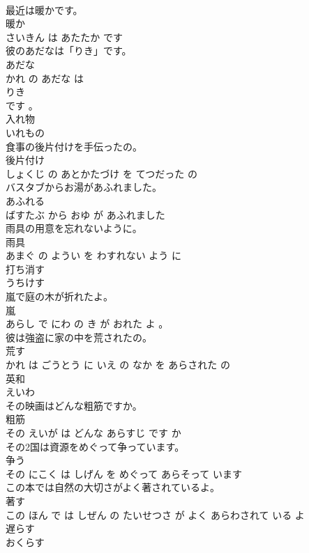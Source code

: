 \documentclass[8pt]{extreport}
\begin{document}
\begin{CJK}{UTF8}{min}
\\	最近は暖かです。	
\\	暖か 
\\	さいきん は あたたか です			
\\	彼のあだなは「りき」です。	
\\	あだな 
\\	かれ の あだな は 
\\	りき 
\\	です 。			
\\	入れ物	
\\	いれもの		
\\	食事の後片付けを手伝ったの。	
\\	後片付け 
\\	しょくじ の あとかたづけ を てつだった の			
\\	バスタブからお湯があふれました。	
\\	あふれる 
\\	ばすたぶ から おゆ が あふれました			
\\	雨具の用意を忘れないように。	
\\	雨具 
\\	あまぐ の ようい を わすれない よう に			
\\	打ち消す	
\\	うちけす		
\\	嵐で庭の木が折れたよ。	
\\	嵐 
\\	あらし で にわ の き が おれた よ 。			
\\	彼は強盗に家の中を荒されたの。	
\\	荒す 
\\	かれ は ごうとう に いえ の なか を あらされた の			
\\	英和	
\\	えいわ		
\\	その映画はどんな粗筋ですか。	
\\	粗筋 
\\	その えいが は どんな あらすじ です か			
\\	その2国は資源をめぐって争っています。	
\\	争う 
\\	その にこく は しげん を めぐって あらそって います			
\\	この本では自然の大切さがよく著されているよ。	
\\	著す 
\\	この ほん で は しぜん の たいせつさ が よく あらわされて いる よ			
\\	遅らす	
\\	おくらす		

\end{CJK}
\end{document}
